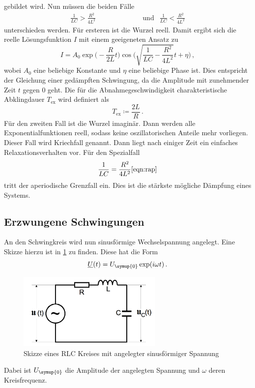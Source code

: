 gebildet wird. Nun müssen die beiden Fälle
\begin{align}
  \frac{1}{LC}>\frac{R^2}{4L^2} & \qquad\qquad\qquad\text{und} & \frac{1}{LC}<\frac{R^2}{4L^2}
\end{align}
unterschieden werden. Für ersteren ist die Wurzel reell. Damit ergibt sich die
reelle Lösungsfunktion $I$ mit einem geeigeneten Ansatz zu
\begin{equation}
  I=A_{\text{0}}\exp\biggl(-\frac{R}{2L}t\biggr)\cos\Biggl(
  \sqrt{\frac{1}{LC}-\frac{R^2}{4L^2}}t+\eta\Biggr)\,,
  \label{eqn:ifunktion}
\end{equation}
wobei $A_{\text{0}}$ eine beliebige Konstante und $\eta$ eine beliebige Phase ist.
Dies entspricht der Gleichung einer gedämpften Schwingung, da die Amplitude mit zunehmender
Zeit $t$ gegen $0$ geht.
Die für die Abnahmegeschwindigkeit charakteristische Abklingdauer $T_{\text{ex}}$
wird definiert als
\begin{equation}
  T_{\text{ex}}\coloneq\frac{2L}{R} \,.
  \label{eqn:abklingdauer}
\end{equation}
Für den zweiten Fall ist die Wurzel imaginär. Dann werden alle Exponentialfunktionen
reell, sodass keine oszillatorischen Anteile mehr vorliegen. Dieser Fall wird
Kriechfall genannt. Dann liegt nach einiger Zeit ein einfaches Relaxationsverhalten
vor. Für den Spezialfall
\begin{equation}
  \frac{1}{LC}=\frac{R^2}{4L^2}
  \ref{eqn:rap}
\end{equation}
tritt der aperiodische Grenzfall ein. Dies ist die stärkste mögliche Dämpfung eines
Systems.

\subsection{Erzwungene Schwingungen}
\label{Erzwungene_Schwingungen}

An den Schwingkreis wird nun sinusförmige Wechselspannung angelegt. Eine Skizze
hierzu ist in \ref{fig:RLC_sinus} zu finden. Diese hat die Form
\begin{equation}
  \underline{U}(t)=U_{\symup{0}}\exp(i\omega t) \,.
\end{equation}

\begin{figure}
  \centering
  \includegraphics[width=200pt]{data/angeregter_schwingkreis_theorie.png}
  \caption{Skizze eines RLC Kreises mit angelegter sinusförmiger Spannung
  \cite{Versuchsanleitung1}}
  \label{fig:RLC_sinus}
\end{figure}
Dabei ist $U_{\symup{0}}$ die Amplitude der angelegten Spannung und $\omega$ deren
Kreisfrequenz.

